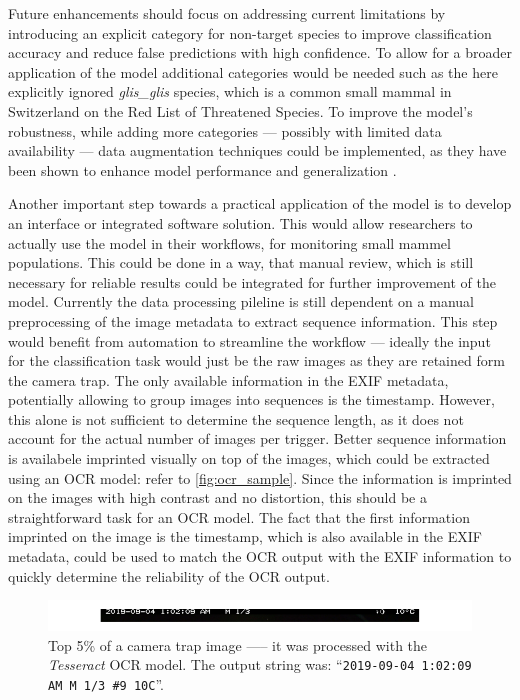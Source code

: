Future enhancements should focus on addressing current limitations by introducing an explicit category for non-target species to improve classification accuracy and reduce false predictions with high confidence.
To allow for a broader application of the model additional categories would be needed such as the here explicitly ignored \textit{glis\_glis} species, which is a common small mammal in Switzerland on the \textcite{iucnIUCNRedList2025} Red List of Threatened Species.
To improve the model's robustness, while adding more categories --- possibly with limited data availability --- data augmentation techniques could be implemented, as they have been shown to enhance model performance and generalization \autocite{shortenSurveyImageData2019}.

Another important step towards a practical application of the model is to develop an interface or integrated software solution.
This would allow researchers to actually use the model in their workflows, for monitoring small mammel populations.
This could be done in a way, that manual review, which is still necessary for reliable results could be integrated for further improvement of the model.
Currently the data processing pileline is still dependent on a manual preprocessing of the image metadata to extract sequence information.
This step would benefit from automation to streamline the workflow --- ideally the input for the classification task would just be the raw images as they are retained form the camera trap.
The only available information in the \ac{EXIF} metadata, potentially allowing to group images into sequences is the timestamp.
However, this alone is not sufficient to determine the sequence length, as it does not account for the actual number of images per trigger.
Better sequence information is availabele imprinted visually on top of the images, which could be extracted using an \ac{OCR} model: refer to \autoref{fig:ocr_sample}.
Since the information is imprinted on the images with high contrast and no distortion, this should be a straightforward task for an \ac{OCR} model.
The fact that the first information imprinted on the image is the timestamp, which is also available in the \ac{EXIF} metadata, could be used to match the \ac{OCR} output with the \ac{EXIF} information to quickly determine the reliability of the \ac{OCR} output.

\begin{figure}[ht]
\centering
\includegraphics{figures/ocr_example.pdf}
\caption{Top 5\% of a camera trap image —-- it was processed with the \textit{Tesseract} \ac{OCR} model. The output string was: \enquote{\texttt{2019-09-04 1:02:09 AM M 1/3 \#9 10\textdegree C}}.}
\label{fig:ocr_sample}
\end{figure}


